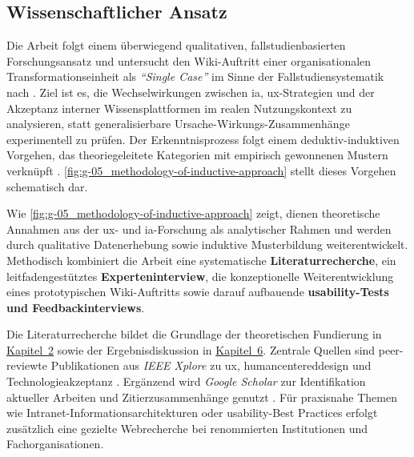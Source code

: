 \subsection{Wissenschaftlicher Ansatz}
\label{subsec:01-05-01_sci-approach}

Die Arbeit folgt einem überwiegend qualitativen, fallstudienbasierten Forschungsansatz und untersucht den Wiki-Auftritt einer organisationalen Transformationseinheit als \textit{\enquote{Single Case}} im Sinne der Fallstudiensystematik nach \citeauthor{404:Yin2018} \cite{404:Yin2018}. Ziel ist es, die Wechselwirkungen zwischen \Gls{ia}, \Gls{ux}-Strategien und der Akzeptanz interner Wissensplattformen im realen Nutzungskontext zu analysieren, statt generalisierbare Ursache-Wirkungs-Zusammenhänge experimentell zu prüfen. Der Erkenntnisprozess folgt einem deduktiv-induktiven Vorgehen, das theoriegeleitete Kategorien mit empirisch gewonnenen Mustern verknüpft \cite{601:Schadewitz2007}. \autoref{fig:g-05_methodology-of-inductive-approach} stellt dieses Vorgehen schematisch dar.


Wie \autoref{fig:g-05_methodology-of-inductive-approach} zeigt, dienen theoretische Annahmen aus der \Gls{ux}- und \Gls{ia}-Forschung als analytischer Rahmen und werden durch qualitative Datenerhebung sowie induktive Musterbildung weiterentwickelt. Methodisch kombiniert die Arbeit eine systematische \textbf{Literaturrecherche}, ein leitfadengestütztes \textbf{Experteninterview}, die konzeptionelle Weiterentwicklung eines prototypischen Wiki-Auftritts sowie darauf aufbauende \textbf{\Gls{usability}-Tests und Feedbackinterviews}.

Die Literaturrecherche bildet die Grundlage der theoretischen Fundierung in \hyperref[ch:02_theoretical-foundations]{Kapitel~2} sowie der Ergebnisdiskussion in \hyperref[ch:06_discussion]{Kapitel~6}. Zentrale Quellen sind peer-reviewte Publikationen aus \textit{IEEE Xplore} zu \Gls{ux}, \Gls{humancentereddesign} und Technologieakzeptanz \cite{902:IEEEXplore}. Ergänzend wird \textit{Google Scholar} zur Identifikation aktueller Arbeiten und Zitierzusammenhänge genutzt \cite{903:GoogleScholar}. Für praxisnahe Themen wie Intranet-Informationsarchitekturen oder \Gls{usability}-Best Practices erfolgt zusätzlich eine gezielte Webrecherche bei renommierten Institutionen und Fachorganisationen.

